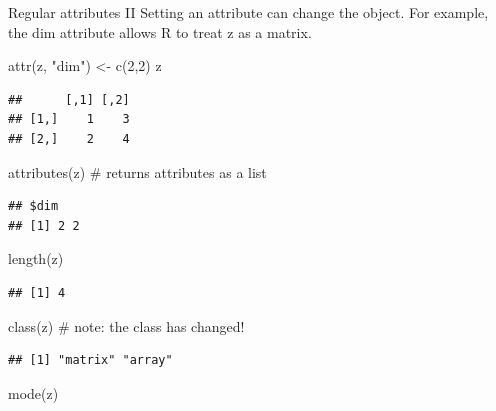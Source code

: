 \documentclass[
  9pt,
  ignorenonframetext,
]{beamer}
\newenvironment{Shaded}{\begin{snugshade}}{\end{snugshade}}
\newcommand{\CommentTok}[1]{\textcolor[rgb]{0.50,0.62,0.50}{#1}}
\newcommand{\DecValTok}[1]{\textcolor[rgb]{0.86,0.86,0.80}{#1}}
\newcommand{\KeywordTok}[1]{\textcolor[rgb]{0.94,0.87,0.69}{#1}}
\newcommand{\NormalTok}[1]{\textcolor[rgb]{0.80,0.80,0.80}{#1}}
\newcommand{\StringTok}[1]{\textcolor[rgb]{0.80,0.58,0.58}{#1}}
\begin{document}
\begin{frame}[fragile]{Regular attributes II}
\protect\hypertarget{regular-attributes-ii}{}
Setting an attribute can change the object. For example, the dim
attribute allows R to treat z as a matrix. \footnotesize \vfill

\begin{Shaded}
\begin{Highlighting}[]
\KeywordTok{attr}\NormalTok{(z, }\StringTok{"dim"}\NormalTok{) \textless{}{-}}\StringTok{ }\KeywordTok{c}\NormalTok{(}\DecValTok{2}\NormalTok{,}\DecValTok{2}\NormalTok{)}
\NormalTok{z}
\end{Highlighting}
\end{Shaded}

\begin{verbatim}
##      [,1] [,2]
## [1,]    1    3
## [2,]    2    4
\end{verbatim}

\begin{Shaded}
\begin{Highlighting}[]
\KeywordTok{attributes}\NormalTok{(z)   }\CommentTok{\# returns attributes as a list}
\end{Highlighting}
\end{Shaded}

\begin{verbatim}
## $dim
## [1] 2 2
\end{verbatim}

\begin{Shaded}
\begin{Highlighting}[]
\KeywordTok{length}\NormalTok{(z)}
\end{Highlighting}
\end{Shaded}

\begin{verbatim}
## [1] 4
\end{verbatim}

\begin{Shaded}
\begin{Highlighting}[]
\KeywordTok{class}\NormalTok{(z)        }\CommentTok{\# note: the class has changed!}
\end{Highlighting}
\end{Shaded}

\begin{verbatim}
## [1] "matrix" "array"
\end{verbatim}

\begin{Shaded}
\begin{Highlighting}[]
\KeywordTok{mode}\NormalTok{(z)}
\end{Highlighting}
\end{Shaded}


\end{frame}
\end{document}
